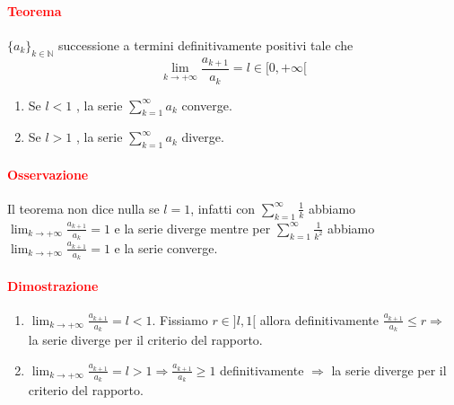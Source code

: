 \documentclass{article}
\newcommand{\N}{\mathbb{N}}
\begin{document}
\paragraph{\textcolor{red}{Teorema}}
$\{a_k\}_{k\in \N}$ successione a termini definitivamente positivi tale che 
\begin{equation*}
    \lim_{k \rightarrow +\infty} \frac{a_{k+1}}{a_k} = l \in [0,+\infty[
\end{equation*}
\begin{enumerate}
    \item Se $l<1$ , la serie $\sum_{k=1}^{\infty} a_k$ converge.
    \item Se $l> 1$ , la serie $\sum_{k=1}^{\infty} a_k$ diverge.
\end{enumerate}

\paragraph{\textcolor{red}{Osservazione}}
Il teorema non dice nulla se $l=1$, infatti con $\sum_{k=1}^{\infty} \frac{1}{k}$ abbiamo $\lim_{k \rightarrow +\infty} \frac{a_{k+1}}{a_k}=1$ e la serie diverge mentre per $\sum_{k=1}^{\infty} \frac{1}{k^2} $ abbiamo $\lim_{k \rightarrow +\infty} \frac{a_{k+1}}{a_k}=1$ e la serie converge.

\paragraph{\textcolor{red}{Dimostrazione}}
\begin{enumerate}
    \item $\lim_{k \rightarrow +\infty} \frac{a_{k+1}}{a_k}=l < 1$. Fissiamo $r \in ]l, 1[$ allora definitivamente $\frac{a_{k+1}}{a_k}\leq r \Rightarrow$ la serie diverge per il criterio del rapporto.

    \item $\lim_{k \rightarrow +\infty} \frac{a_{k+1}}{a_k} = l > 1 \Rightarrow \frac{a_{k+1}}{a_k} \geq 1$ definitivamente $\Rightarrow$ la serie diverge per il criterio del rapporto.
\end{enumerate}
\begin{flushright}
\large\Lightning
\end{flushright}
\end{document}
